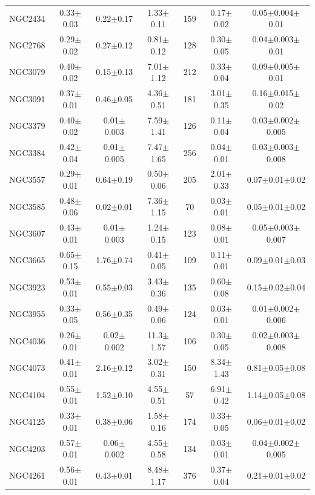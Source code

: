 \documentclass[iop]{emulateapj}
\begin{document}
\begin{table}
\begin{tabular}{lcccccc}
NGC2434 & 0.33$\pm$0.03 & 0.22$\pm$0.17 & 1.33$\pm$0.11  & 159 & 0.17$\pm$0.02  & 0.05$\pm$0.004$\pm$0.01  \\
NGC2768 & 0.29$\pm$0.02 & 0.27$\pm$0.12 & 0.81$\pm$0.12 & 128 & 0.30$\pm$0.05 & 0.04$\pm$0.003$\pm$0.01 \\
NGC3079 & 0.40$\pm$0.02 & 0.15$\pm$0.13 & 7.01$\pm$1.12 & 212 & 0.33$\pm$0.04 & 0.09$\pm$0.005$\pm$0.01 \\
NGC3091 & 0.37$\pm$0.01 & 0.46$\pm$0.05 & 4.36$\pm$0.51 & 181 & 3.01$\pm$0.35 & 0.16$\pm$0.015$\pm$0.02   \\
NGC3379 & 0.40$\pm$0.02 & 0.01$\pm$0.003 & 7.59$\pm$1.41 & 126 & 0.11$\pm$0.04 & 0.03$\pm$0.002$\pm$0.005 \\
NGC3384 & 0.42$\pm$0.04 & 0.01$\pm$0.005 & 7.47$\pm$1.65 & 256 & 0.04$\pm$0.01 & 0.03$\pm$0.003$\pm$0.008 \\
NGC3557 & 0.29$\pm$0.01 & 0.64$\pm$0.19  & 0.50$\pm$0.06  & 205  & 2.01$\pm$0.33  & 0.07$\pm$0.01$\pm$0.02  \\
NGC3585 & 0.48$\pm$0.06 & 0.02$\pm$0.01 & 7.36$\pm$1.15 & 70 & 0.03$\pm$0.01 & 0.05$\pm$0.01$\pm$0.02    \\
NGC3607 & 0.43$\pm$0.01 & 0.01$\pm$0.003  & 1.24$\pm$0.15  & 123  & 0.08$\pm$0.01 & 0.05$\pm$0.003$\pm$0.007   \\
NGC3665 & 0.65$\pm$0.15 & 1.76$\pm$0.74  & 0.41$\pm$0.05  & 109  & 0.11$\pm$0.01 & 0.09$\pm$0.01$\pm$0.03   \\
NGC3923 & 0.53$\pm$0.01 & 0.55$\pm$0.03 & 3.43$\pm$0.36  & 135  & 0.60$\pm$0.08  & 0.15$\pm$0.02$\pm$0.04   \\
NGC3955 & 0.33$\pm$0.05 & 0.56$\pm$0.35 & 0.49$\pm$0.06 & 124 & 0.03$\pm$0.01 & 0.01$\pm$0.002$\pm$0.006   \\
NGC4036 & 0.26$\pm$0.01 & 0.02$\pm$0.002 & 11.3$\pm$1.57 & 106 & 0.30$\pm$0.05 & 0.02$\pm$0.003$\pm$0.008 \\
NGC4073 & 0.41$\pm$0.01 & 2.16$\pm$0.12 & 3.02$\pm$0.31 & 150 & 8.34$\pm$1.43  & 0.81$\pm$0.05$\pm$0.08   \\
NGC4104 & 0.55$\pm$0.01 & 1.52$\pm$0.10 & 4.55$\pm$0.51 & 57  & 6.91$\pm$0.42  & 1.14$\pm$0.05$\pm$0.08   \\
NGC4125 & 0.33$\pm$0.01 & 0.38$\pm$0.06  & 1.58$\pm$0.16 & 174 & 0.33$\pm$0.05 & 0.06$\pm$0.01$\pm$0.02    \\
NGC4203 & 0.57$\pm$0.01 & 0.06$\pm$0.002 & 4.55$\pm$0.58 & 134 & 0.03$\pm$0.01 & 0.04$\pm$0.002$\pm$0.005 \\
NGC4261 & 0.56$\pm$0.01 & 0.43$\pm$0.01 & 8.48$\pm$1.17 & 376 & 0.37$\pm$0.04 & 0.21$\pm$0.01$\pm$0.02    \\

\end{tabular}
\end{table}
\end{document}

